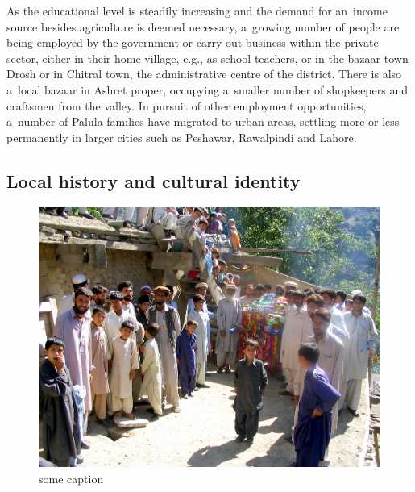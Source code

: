 As the educational level is steadily increasing and the demand for an~income source besides agriculture is deemed necessary, a~growing number of people are being employed by the government or carry out business within the private sector, either in their home village, e.g., as school teachers, or in the bazaar town Drosh or in Chitral town, the administrative centre of the district. There is also a~local bazaar in Ashret proper, occupying a~smaller number of shopkeepers and craftsmen from the valley. In pursuit of other employment opportunities, a~number of Palula families have migrated to urban areas, settling more or less permanently in larger cities such as Peshawar, Rawalpindi and Lahore.
 
\subsection{Local history and cultural identity}\label{Local history and cultural identity}
\label{subsec:1-2-3}
\begin{figure}
 \includegraphics[height=.3\textheight]{photos/Photo02--WeddingAshret.JPG}
\caption{some caption}
\label{fig:1:weddingphoto}
\end{figure}


